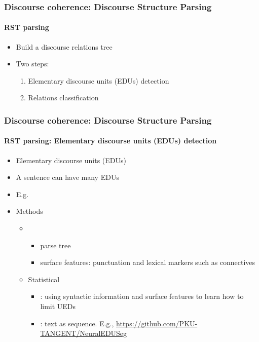 \documentclass[xcolor=table]{beamer}
\begin{document}
\begin{frame}
	\frametitle{Discourse coherence: Discourse Structure Parsing}
	\framesubtitle{RST parsing}
	
	\begin{itemize}
		\item Build a discourse relations tree
		\item Two steps: 
		\begin{enumerate}
			\item Elementary discourse units (EDUs) detection
			\item Relations classification
		\end{enumerate}
	\end{itemize}

	\begin{center}
	\end{center}
	
\end{frame}

\begin{frame}
	\frametitle{Discourse coherence: Discourse Structure Parsing}
	\framesubtitle{RST parsing: Elementary discourse units (EDUs) detection}
	
	\begin{itemize}
		\item Elementary discourse units (EDUs)
		\item A sentence can have many EDUs 
		\item E.g. 
		\item Methods 
		\begin{itemize}
			\item {}
			\begin{itemize}
				\item parse tree
				\item surface features: punctuation and lexical markers such as connectives
			\end{itemize}
			\item Statistical
			\begin{itemize}
				\item {}: using syntactic information and surface features to learn how to limit UEDs
				\item {}: text as sequence. E.g., \url{https://github.com/PKU-TANGENT/NeuralEDUSeg}
			\end{itemize}
		\end{itemize}
	\end{itemize}
	
\end{frame}
\end{document}
